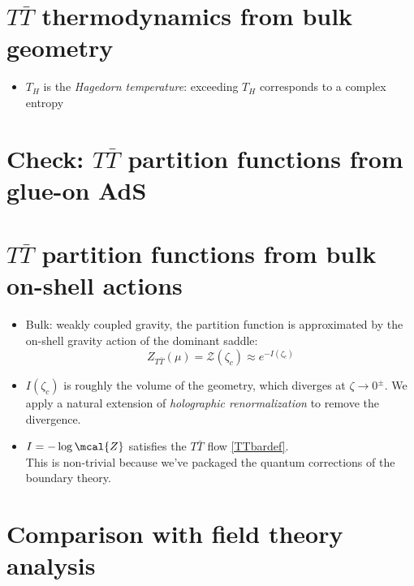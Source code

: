 \documentclass[11pt]{article}
\renewenvironment{frame}[1]%
	{\section*{#1}}%
	{}
\newcommand{\TTbar}{\texorpdfstring{\ensuremath{T\bar{T}}}{TTbar}\xspace}
\begin{document}
\begin{multicols}{3}
\begin{frame}{\TTbar thermodynamics from bulk geometry}{%
	\textcite{Giveon:2017nie,Apolo:2019zai}
}
\begin{itemize}
\item $T_H$ is the \textit{Hagedorn temperature}: exceeding $T_H$ corresponds to a complex entropy
\end{itemize}

\end{frame}

\section{\textbf{Check:} \TTbar partition functions from glue-on AdS} \label{se:partitionfunction}

\begin{frame}{\TTbar partition functions from bulk on-shell actions}{%
	\textcite{Caputa:2020lpa}
}

\begin{itemize}
\item Bulk: weakly coupled gravity, the partition function is approximated by the on-shell gravity action of the dominant saddle:
	\begin{equation}
		Z_{T\bar T} (\mu) = \mathcal Z (\zeta_c) \approx  e^{-I(\zeta_c)}\label{partition2}
	\end{equation}


\item $I(\zeta_c)$ is roughly the volume of the geometry, which diverges at $\zeta \to 0^\pm$. We apply a natural extension of \textit{holographic renormalization} to remove the divergence.


\item $I = -\log \mcal{Z}$ satisfies the \TTbar flow \eqref{TTbardef}.\\
	This is non-trivial because we've packaged the quantum corrections of the boundary theory.
\end{itemize}
\end{frame}

\begin{frame}{Comparison with field theory analysis}{%
	\textcite{Datta:2018thy,Apolo:2023aho}
}

\vspace{-.3\baselineskip}


\end{frame}
\end{multicols}
\end{document}
